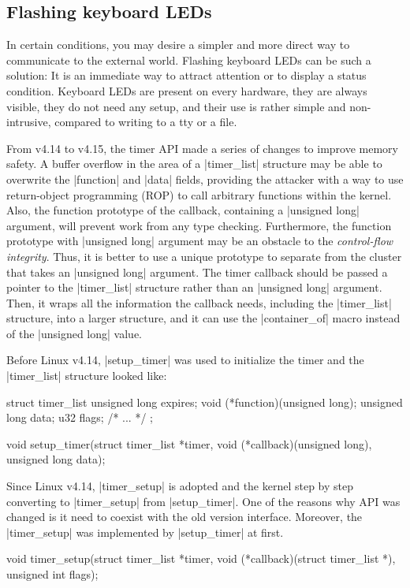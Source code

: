 \documentclass[10pt, oneside]{book}
\begin{document}
\subsection{Flashing keyboard LEDs}
\label{sec:flash_kb_led}
In certain conditions, you may desire a simpler and more direct way to communicate to the external world.
Flashing keyboard LEDs can be such a solution: It is an immediate way to attract attention or to display a status condition.
Keyboard LEDs are present on every hardware, they are always visible, they do not need any setup, and their use is rather simple and non-intrusive, compared to writing to a tty or a file.

From v4.14 to v4.15, the timer API made a series of changes to improve memory safety.
A buffer overflow in the area of a \cpp|timer_list| structure may be able to overwrite the \cpp|function| and \cpp|data| fields, providing the attacker with a way to use return-object programming (ROP) to call arbitrary functions within the kernel.
Also, the function prototype of the callback, containing a \cpp|unsigned long| argument, will prevent work from any type checking.
Furthermore, the function prototype with \cpp|unsigned long| argument may be an obstacle to the \textit{control-flow integrity}.
Thus, it is better to use a unique prototype to separate from the cluster that takes an \cpp|unsigned long| argument.
The timer callback should be passed a pointer to the \cpp|timer_list| structure rather than an \cpp|unsigned long| argument.
Then, it wraps all the information the callback needs, including the \cpp|timer_list| structure, into a larger structure, and it can use the \cpp|container_of| macro instead of the \cpp|unsigned long| value.

Before Linux v4.14, \cpp|setup_timer| was used to initialize the timer and the \cpp|timer_list| structure looked like:
\begin{code}
struct timer_list {
    unsigned long expires;
    void (*function)(unsigned long);
    unsigned long data;
    u32 flags;
    /* ... */
};

void setup_timer(struct timer_list *timer, void (*callback)(unsigned long),
                 unsigned long data);
\end{code}

Since Linux v4.14, \cpp|timer_setup| is adopted and the kernel step by step converting to \cpp|timer_setup| from \cpp|setup_timer|.
One of the reasons why API was changed is it need to coexist with the old version interface.
Moreover, the \cpp|timer_setup| was implemented by \cpp|setup_timer| at first.
\begin{code}
void timer_setup(struct timer_list *timer,
                 void (*callback)(struct timer_list *), unsigned int flags);
\end{code}
\end{document}
